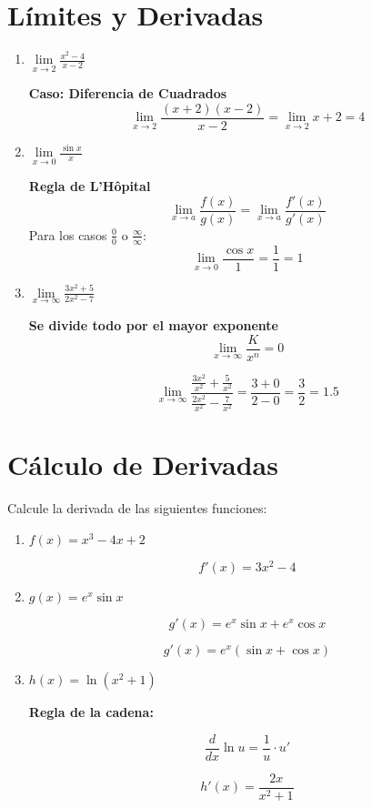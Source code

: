 \section{Límites y Derivadas}

\begin{enumerate}
    \item $ \lim\limits_{x \to 2} \frac{x^2 - 4}{x - 2} $
    
    \textbf{Caso: Diferencia de Cuadrados}
    \[ \lim\limits_{x \to 2} \frac{(x+2)(x-2)}{x-2} = \lim\limits_{x \to 2} x+2 = 4 \]
    
    \item $ \lim\limits_{x \to 0} \frac{\sin x}{x} $
    
    \textbf{Regla de L'Hôpital}
    \[ \lim\limits_{x \to a} \frac{f(x)}{g(x)} = \lim\limits_{x \to a} \frac{f'(x)}{g'(x)} \]
    Para los casos $ \frac{0}{0} $ o $ \frac{\infty}{\infty} $:
    \[ \lim\limits_{x \to 0} \frac{\cos x}{1} = \frac{1}{1} = 1 \]
    
    \item $ \lim\limits_{x \to \infty} \frac{3x^2 + 5}{2x^2 - 7} $
    
    \textbf{Se divide todo por el mayor exponente}
    \[ \lim\limits_{x \to \infty} \frac{K}{x^n} = 0 \]
    
    \[ \lim\limits_{x \to \infty} \frac{\frac{3x^2}{x^2} + \frac{5}{x^2}}{\frac{2x^2}{x^2} - \frac{7}{x^2}} = \frac{3 + 0}{2 - 0} = \frac{3}{2} = 1.5 \]
    
\end{enumerate}

\section*{Cálculo de Derivadas}

Calcule la derivada de las siguientes funciones:

\begin{enumerate}
    \item \( f(x) = x^3 - 4x + 2 \)
    
    \[
    f'(x) = 3x^2 - 4
    \]

    \item \( g(x) = e^x \sin x \)
    
    \[
    g'(x) = e^x \sin x + e^x \cos x
    \]
    
    \[
    g'(x) = e^x (\sin x + \cos x)
    \]

    \item \( h(x) = \ln(x^2 + 1) \)
    
    \textbf{Regla de la cadena:}
    
    \[
    \frac{d}{dx} \ln u = \frac{1}{u} \cdot u'
    \]
    
    \[
    h'(x) = \frac{2x}{x^2 + 1}
    \]
\end{enumerate}